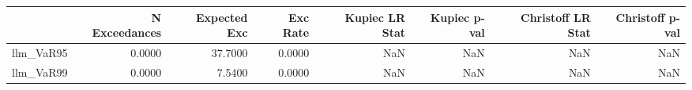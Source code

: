\begin{tabular}{lrrrrrrr}
\toprule
 & N Exceedances & Expected Exc & Exc Rate & Kupiec LR Stat & Kupiec p-val & Christoff LR Stat & Christoff p-val \\
\midrule
llm_VaR95 & 0.0000 & 37.7000 & 0.0000 & NaN & NaN & NaN & NaN \\
llm_VaR99 & 0.0000 & 7.5400 & 0.0000 & NaN & NaN & NaN & NaN \\
\bottomrule
\end{tabular}
